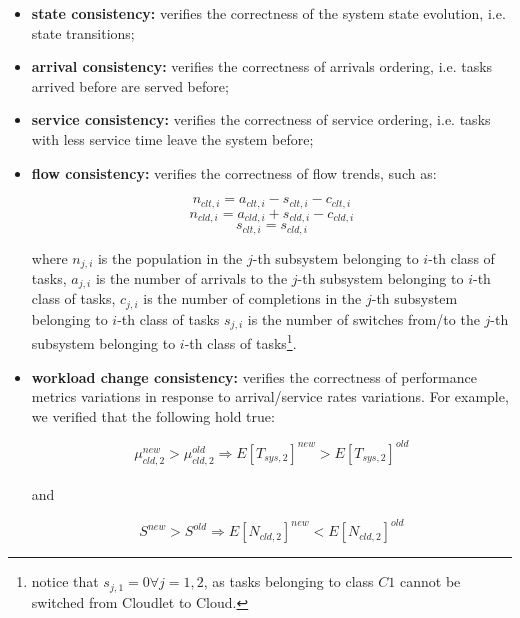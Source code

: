 \begin{itemize}
	\item \textbf{state consistency:} verifies the correctness of the system state evolution, i.e. state transitions;
	
	\item \textbf{arrival consistency:} verifies the correctness of arrivals ordering, i.e. tasks arrived before are served before;
	
	\item \textbf{service consistency:} verifies the correctness of service ordering, i.e. tasks with less service time leave the system before;
	
	\item \textbf{flow consistency:} verifies the correctness of flow trends, such as:
	
	\begin{equation}
	n_{clt,i}=a_{clt,i}-s_{clt,i}-c_{clt,i}
	\end{equation}
	\begin{equation}
	n_{cld,i}=a_{cld,i}+s_{cld,i}-c_{cld,i}
	\end{equation}
	\begin{equation}
	s_{clt,i}=s_{cld,i}
	\end{equation}
	
	where 
	$n_{j,i}$ is the population in the $j$-th subsystem belonging to $i$-th class of tasks, 
	$a_{j,i}$ is the number of arrivals to the $j$-th subsystem belonging to $i$-th class of tasks,
	$c_{j,i}$ is the number of completions in the $j$-th subsystem belonging to $i$-th class of tasks
	$s_{j,i}$ is the number of switches from/to the $j$-th subsystem belonging to $i$-th class of tasks\footnote{notice that $s_{j,1}=0\forall j=1,2$, as tasks belonging to class $C1$ cannot be switched from Cloudlet to Cloud.}.
	 
	\item \textbf{workload change consistency:} verifies the correctness of performance metrics variations in response to arrival/service rates variations. For example, we verified that the following hold true:
	
	\begin{equation}
		\mu_{cld,2}^{new} > \mu_{cld,2}^{old} \Rightarrow E[T_{sys,2}]^{new} > E[T_{sys,2}]^{old}
	\end{equation}
	\\
	and
	
	\begin{equation}
	S^{new} > S^{old} \Rightarrow E[N_{cld,2}]^{new} < E[N_{cld,2}]^{old}
	\end{equation}
\end{itemize}

